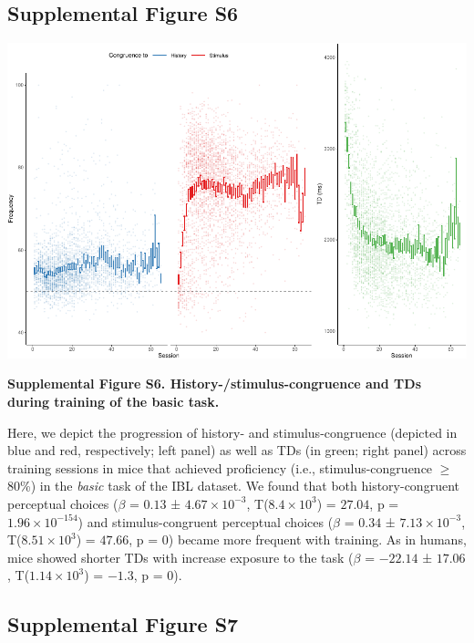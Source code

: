 \documentclass[
]{article}
\begin{document}
\newpage

\hypertarget{supplemental-figure-s6}{%
\subsection{Supplemental Figure S6}\label{supplemental-figure-s6}}

\includegraphics{modes_mouse_files/figure-latex/Supplemental_Figure_S6-1.pdf}

\textbf{Supplemental Figure S6. History-/stimulus-congruence and TDs
during training of the basic task.}

Here, we depict the progression of history- and stimulus-congruence
(depicted in blue and red, respectively; left panel) as well as TDs (in
green; right panel) across training sessions in mice that achieved
proficiency (i.e., stimulus-congruence \(\geq\) 80\%) in the
\emph{basic} task of the IBL dataset. We found that both
history-congruent perceptual choices (\(\beta\) = \(0.13\) ±
\(\ensuremath{4.67\times 10^{-3}}\),
T(\(\ensuremath{8.4\times 10^{3}}\)) = \(27.04\), p =
\(\ensuremath{1.96\times 10^{-154}}\)) and stimulus-congruent perceptual
choices (\(\beta\) = \(0.34\) ± \(\ensuremath{7.13\times 10^{-3}}\),
T(\(\ensuremath{8.51\times 10^{3}}\)) = \(47.66\), p = \(0\)) became
more frequent with training. As in humans, mice showed shorter TDs with
increase exposure to the task (\(\beta\) = \(-22.14\) ± \(17.06\),
T(\(\ensuremath{1.14\times 10^{3}}\)) = \(-1.3\), p = \(0\)).

\newpage

\hypertarget{supplemental-figure-s7}{%
\subsection{Supplemental Figure S7}\label{supplemental-figure-s7}}
\end{document}
